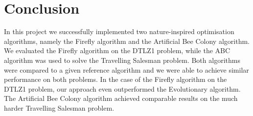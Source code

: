 \section{Conclusion}

In this project we successfully implemented two nature-inspired optimisation algorithms, namely the Firefly algorithm and the Artificial Bee Colony algorithm. We evaluated the Firefly algorithm on the DTLZ1 problem, while the ABC algorithm was used to solve the Travelling Salesman problem. Both algorithms were compared to a given reference algorithm and we were able to achieve similar performance on both problems. In the case of the Firefly algorithm on the DTLZ1 problem, our approach even outperformed the Evolutionary algorithm. The Artificial Bee Colony algorithm achieved comparable results on the much harder Travelling Salesman problem.
